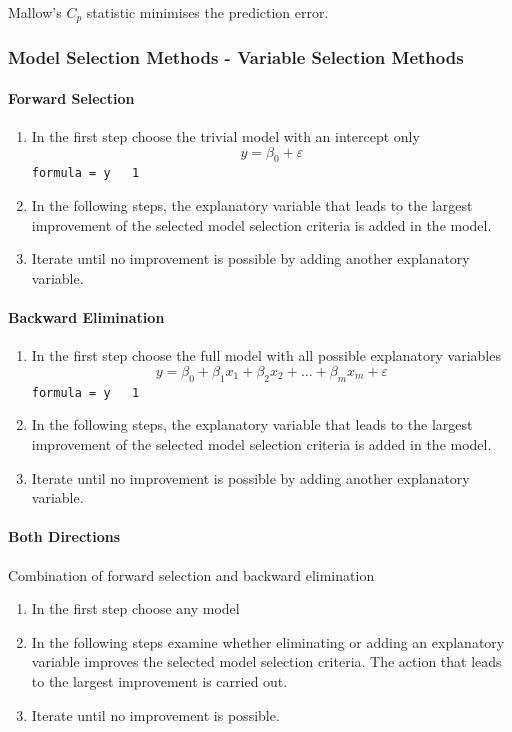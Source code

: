 \documentclass[11pt]{article}
\theoremstyle{definition}
\begin{document}
Mallow’s $C_p$ statistic minimises the prediction error.

\subsubsection{Model Selection Methods - Variable Selection Methods}
\paragraph{Forward Selection}
\begin{enumerate}
	\item In the first step choose the trivial model with an intercept only
	\begin{equation*}
		y=\beta_0 + \varepsilon
	\end{equation*}
	\texttt{formula = y ~ 1}
	\item In the following steps, the explanatory variable that leads to the largest improvement of the selected model selection criteria is added in the model.
	\item Iterate until no improvement is possible by adding another explanatory variable.
\end{enumerate}

\paragraph{Backward Elimination}
\begin{enumerate}
	\item In the first step choose the full model with all possible explanatory variables
	\begin{equation*}
		y=\beta_0 + \beta_1 x_1 + \beta_2 x_2 + \dots + \beta_m x_m + \varepsilon
	\end{equation*}
	\texttt{formula = y ~ 1}
	\item In the following steps, the explanatory variable that leads to the largest improvement of the selected model selection criteria is added in the model.
	\item Iterate until no improvement is possible by adding another explanatory variable.
\end{enumerate}

\paragraph{Both Directions}
Combination of forward selection and backward elimination
\begin{enumerate}
	\item In the first step choose any model
	\item In the following steps examine whether eliminating or adding an explanatory variable improves the selected model selection criteria. The action that leads to the largest improvement is carried out.
	\item Iterate until no improvement is possible.
\end{enumerate}
\end{document}
